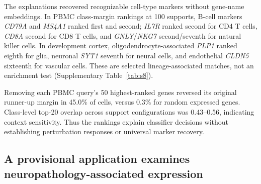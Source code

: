 The explanations recovered recognizable cell-type markers without gene-name embeddings. In PBMC class-margin rankings at 100 supports, B-cell markers \textit{CD79A} and \textit{MS4A1} ranked first and second; \textit{IL7R} ranked second for CD4 T cells, \textit{CD8A} second for CD8 T cells, and \textit{GNLY}/\textit{NKG7} second/seventh for natural killer cells\cite{hao2021multimodal,schafflick2020leukocytes}. In development cortex, oligodendrocyte-associated \textit{PLP1} ranked eighth for glia, neuronal \textit{SYT1} seventh for neural cells, and endothelial \textit{CLDN5} sixteenth for vascular cells\cite{gong2025stereoseq}. These are selected lineage-associated matches, not an enrichment test (Supplementary Table~\ref{tab:s8}).

Removing each PBMC query's 50 highest-ranked genes reversed its original runner-up margin in 45.0\% of cells, versus 0.3\% for random expressed genes. Class-level top-20 overlap across support configurations was 0.43--0.56, indicating context sensitivity. Thus the rankings explain classifier decisions without establishing perturbation responses or universal marker recovery.

\subsection*{A provisional application examines neuropathology-associated expression}




